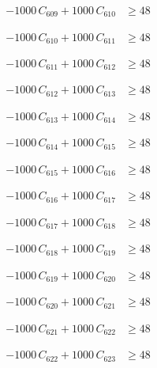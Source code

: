 \documentclass[a4paper,11pt]{article}
\begin{document}
\begin{align}
-1000\,C_{609} + 1000\,C_{610} &\geq 48 \nonumber
\end{align}

\begin{align}
-1000\,C_{610} + 1000\,C_{611} &\geq 48 \nonumber
\end{align}

\begin{align}
-1000\,C_{611} + 1000\,C_{612} &\geq 48 \nonumber
\end{align}

\begin{align}
-1000\,C_{612} + 1000\,C_{613} &\geq 48 \nonumber
\end{align}

\begin{align}
-1000\,C_{613} + 1000\,C_{614} &\geq 48 \nonumber
\end{align}

\begin{align}
-1000\,C_{614} + 1000\,C_{615} &\geq 48 \nonumber
\end{align}

\begin{align}
-1000\,C_{615} + 1000\,C_{616} &\geq 48 \nonumber
\end{align}

\begin{align}
-1000\,C_{616} + 1000\,C_{617} &\geq 48 \nonumber
\end{align}

\begin{align}
-1000\,C_{617} + 1000\,C_{618} &\geq 48 \nonumber
\end{align}

\begin{align}
-1000\,C_{618} + 1000\,C_{619} &\geq 48 \nonumber
\end{align}

\begin{align}
-1000\,C_{619} + 1000\,C_{620} &\geq 48 \nonumber
\end{align}

\begin{align}
-1000\,C_{620} + 1000\,C_{621} &\geq 48 \nonumber
\end{align}

\begin{align}
-1000\,C_{621} + 1000\,C_{622} &\geq 48 \nonumber
\end{align}

\begin{align}
-1000\,C_{622} + 1000\,C_{623} &\geq 48 \nonumber
\end{align}
\end{document}
